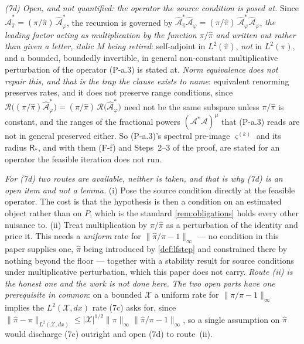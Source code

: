 \begin{remark}
\emph{(7d) Open, and not quantified: the operator the source condition is posed at.} Since
$\hat{\mathcal A}^\ast_{\hat\pi}=(\pi/\hat\pi)\,\hat{\mathcal A}^\ast_\varphi$, the recursion is governed
by $\hat{\mathcal A}^\ast_{\hat\pi}\hat{\mathcal A}_\varphi
=(\pi/\hat\pi)\,\hat{\mathcal A}^\ast_\varphi\hat{\mathcal A}_\varphi$, \emph{the leading factor acting
as multiplication by the function $\pi/\hat\pi$ and written out rather than given a letter, italic $M$
being retired}: self-adjoint in $L^{2}(\hat\pi)$, \emph{not} in $L^{2}(\pi)$, and a bounded, boundedly
invertible, in general non-constant multiplicative perturbation of the operator (P-a.3) is stated at.
\emph{Norm
equivalence does not repair this, and that is the trap the clause exists to name}: equivalent renorming
preserves rates, and it does not preserve range conditions, since
$\mathcal R\big((\pi/\hat\pi)\hat{\mathcal A}^\ast_\varphi\big)
=(\pi/\hat\pi)\,\mathcal R\big(\hat{\mathcal A}^\ast_\varphi\big)$ need not be the same subspace unless
$\pi/\hat\pi$ is constant, and the ranges of the fractional powers
$(\mathcal A^\ast\mathcal A)^{\mu}$ that (P-a.3) reads are not in general preserved either. So
(P-a.3)'s spectral pre-image $\varsigma^{(k)}$ and its radius $\mathsf R_\ast$, and with them (F-f) and
Steps~2--3 of the proof, are stated for an operator the feasible iteration does not run.

\emph{For \textup{(7d)} two routes are available, neither is taken, and that is why \textup{(7d)} is an
open item and not a lemma.} \textup{(i)} Pose the source condition directly at the feasible operator.
The cost is that the hypothesis is then a condition on an estimated object rather than on $P$, which is
the standard \cref{rem:obligations} holds every other nuisance to. \textup{(ii)} Treat multiplication by
$\pi/\hat\pi$ as a perturbation of the identity and price it. This needs a \emph{uniform} rate for
$\|\hat\pi/\pi-1\|_\infty$ --- no condition in this paper supplies one, $\hat\pi$ being introduced by
\cref{def:lfstep} and constrained there by nothing beyond the floor --- together with a stability result
for source conditions under multiplicative perturbation, which this paper does not carry. \emph{Route
\textup{(ii)} is the honest one and the work is not done here.} \emph{The two open parts have one
prerequisite in common}: on a bounded $\mathcal X$ a uniform rate for $\|\hat\pi/\pi-1\|_\infty$ implies
the $L^{2}(\mathcal X,dx)$ rate \textup{(7c)} asks for, since
$\|\hat\pi-\pi\|_{L^{2}(\mathcal X,dx)}\le|\mathcal X|^{1/2}\|\pi\|_\infty\|\hat\pi/\pi-1\|_\infty$, so
a single assumption on $\hat\pi$ would discharge \textup{(7c)} outright and open \textup{(7d)} to
route~\textup{(ii)}.


\end{remark}

